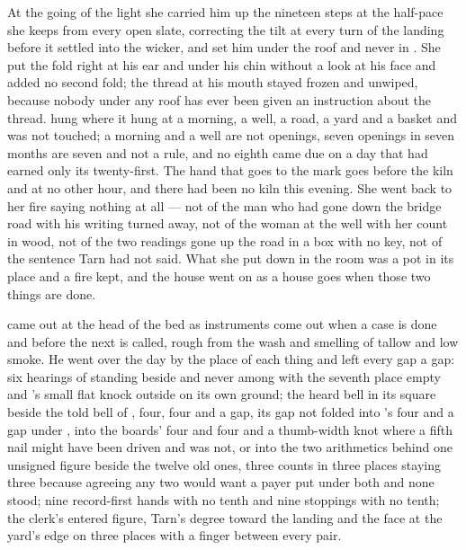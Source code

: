 \scenebreak

At the going of the light she carried him up the nineteen steps at the half-pace she keeps from every open slate, correcting the tilt at every turn of the landing before it settled into the wicker, and set him under the roof and never in . She put the fold right at his ear and under his chin without a look at his face and added no second fold; the thread at his mouth stayed frozen and unwiped, because nobody under any roof has ever been given an instruction about the thread.  hung where it hung at a morning, a well, a road, a yard and a basket and was not touched; a morning and a well are not openings, seven openings in seven months are seven and not a rule, and no eighth came due on a day that had earned only its twenty-first. The hand that goes to the mark goes before the kiln and at no other hour, and there had been no kiln this evening. She went back to her fire saying nothing at all --- not of the man who had gone down the bridge road with his writing turned away, not of the woman at the well with her count in wood, not of the two readings gone up the road in a box with no key, not of the sentence Tarn had not said. What she put down in the room was a pot in its place and a fire kept, and the house went on as a house goes when those two things are done.

\scenebreak

 came out at the head of the bed as instruments come out when a case is done and before the next is called, rough from the wash and smelling of tallow and low smoke. He went over the day by the place of each thing and left every gap a gap: six hearings of  standing beside and never among with the seventh place empty and 's small flat knock outside on its own ground; the heard bell in its square beside the told bell of , four, four and a gap, its gap not folded into 's four and a gap under , into the boards' four and four and a thumb-width knot where a fifth nail might have been driven and was not, or into the two arithmetics behind one unsigned figure beside the twelve old ones, three counts in three places staying three because agreeing any two would want a payer put under both and none stood; nine record-first hands with no tenth and nine stoppings with no tenth; the clerk's entered figure, Tarn's degree toward the landing and the face at the yard's edge on three places with a finger between every pair.

